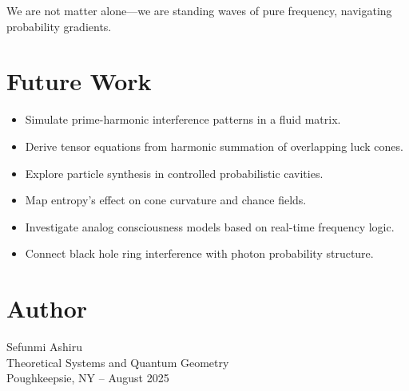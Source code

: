 \documentclass[12pt]{article}
\begin{document}
We are not matter alone---we are standing waves of pure frequency, navigating probability gradients.

\section{Future Work}
\begin{itemize}
    \item Simulate prime-harmonic interference patterns in a fluid matrix.
    \item Derive tensor equations from harmonic summation of overlapping luck cones.
    \item Explore particle synthesis in controlled probabilistic cavities.
    \item Map entropy's effect on cone curvature and chance fields.
    \item Investigate analog consciousness models based on real-time frequency logic.
    \item Connect black hole ring interference with photon probability structure.
\end{itemize}

\section*{Author}
Sefunmi Ashiru\\Theoretical Systems and Quantum Geometry\\Poughkeepsie, NY -- August 2025
\end{document}
